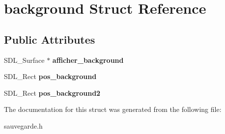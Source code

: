 \hypertarget{structbackground}{}\section{background Struct Reference}
\label{structbackground}
\subsection*{Public Attributes}
\begin{DoxyCompactItemize}
\item 
\mbox{\label{structbackground_a3c24a15deca9bb1811a284cd272a935c}} 
S\+D\+L\+\_\+\+Surface $\ast$ {\bfseries afficher\+\_\+background}
\item 
\mbox{\label{structbackground_a83515216626400ff398e1c81c5d641f5}} 
S\+D\+L\+\_\+\+Rect {\bfseries pos\+\_\+background}
\item 
\mbox{\label{structbackground_a5d49cc1bcd6914a6014cbf8efee705c2}} 
S\+D\+L\+\_\+\+Rect {\bfseries pos\+\_\+background2}
\end{DoxyCompactItemize}


The documentation for this struct was generated from the following file\+:\begin{DoxyCompactItemize}
\item 
sauvegarde.\+h\end{DoxyCompactItemize}
